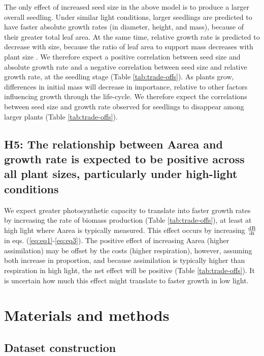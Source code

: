 \documentclass[a4paper,11pt]{article}
\begin{document}
The only effect of increased seed size in the above model is to produce a larger overall seedling. Under similar light conditions, larger seedlings are predicted to have faster absolute growth rates (in diameter, height, and mass), because of their greater total leaf area. At the same time, relative growth rate is predicted to decrease with size, because the ratio of leaf area to support mass decreases with plant size \citep[see also][]{Turnbull:2012ew}. We therefore expect a positive correlation between seed size and absolute growth rate and a negative correlation between seed size and relative growth rate, at the seedling stage (Table \ref{tab:trade-offs}). As plants grow, differences in initial mass will decrease in importance, relative to other factors influencing growth through the life-cycle. We therefore expect the correlations between seed size and growth rate observed for seedlings to disappear among larger plants (Table \ref{tab:trade-offs}).

\subsection*{H5: The relationship between Aarea and growth rate is expected to be positive across all plant sizes, particularly under high-light conditions}

We expect greater photosynthetic capacity to translate into faster growth rates by increasing the rate of biomass production (Table \ref{tab:trade-offs}), at least at high light where Aarea is typically measured. This effect occurs by increasing  $\frac{\rm{d} B}{\rm{d} t} $ in eqs. (\ref{eq:eq1}-\ref{eq:eq3}). The positive effect of increasing Aarea (higher assimilation) may be offset by the costs (higher respiration), however, assuming both increase in proportion, and because assimilation is typically higher than respiration in high light, the net effect will be positive (Table \ref{tab:trade-offs}). It is uncertain how much this effect might translate to faster growth in low light.

\section*{Materials and methods}\label{material-and-methods}

\subsection*{Dataset construction}\label{data-construction}
\end{document}
